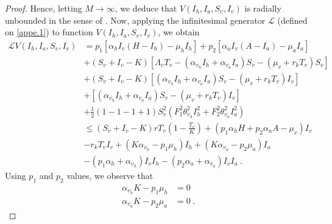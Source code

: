 \begin{proof}
	Hence, letting $M \to \infty$, we deduce that
	$
		V(I_{h},I_{a},S_{v},I_{v})
	$
	is radially unbounded in the sense of .
	Now, applying the infinitesimal generator $\mathcal{L}$ (defined on 
	\ref{appe.1}) to function $V(I_{h},I_{a},S_{v},I_{v})$, we obtain
	\begin{align*}
		\mathcal{L}V(I_{h},I_{a},S_{v},I_{v}) 
			&= p_{1} 
			\left[ 
				\alpha_{h}I_{v}
					\left(
						H-I_{h}
					\right)
					-\mu_{h}I_{h} 
			\right] 
			+ p_{2} 
			\left[
				\alpha_{a}I_{v}
				\left(
					A-I_{a}
				\right)
				-\mu_{a}I_{a} 
			\right]\\
			&+ 
			\left(
				S_{v}+I_{v}-K 
			\right)
			\left[
				\Lambda_{v} T_{v}
				-
				\left(
					\alpha_{v_{h}}I_{h}
					+\alpha_{v_{a}}I_{a}
				\right)S_{v}
				-
				\left(
					\mu_{v} 
					+r_{k}T_{v}
				\right)S_{v}
			\right]
			\\
			&+
			\left(
				S_{v}
				+I_{v}-K
			\right)
			\left[
				\left(
					\alpha_{v_{h}}I_{h}
					+\alpha_{v_{a}}I_{a}
				\right)
				S_{v}
				-
				\left(
					\mu_{v}
					+r_{k}T_{v}
				\right)
				I_{v}
			\right]
			\\
			&+ 
			\left[
				\left(
					\alpha_{v_{h}}I_{h}
					+\alpha_{v_{a}} I_{a}
				\right)
				S_{v}
				-
				\left(
					\mu_{v}
					+r_{k} T_{v}
				\right)
				I_{v}
			\right]
			\\
			&+
			\frac{1}{2}
			\left(
				1-1-1+1
			\right)
			S_{v}^{2}
			\left(
				F_{1}^{2}\theta_{v_{h}}^{2}I_{h}^{2}
				+F_{2}^{2}\theta_{v_{a}}^{2}I_{a}^{2}
			\right)
			\\
			&\leq
			\left(
				S_{v} + I_{v}-K
			\right) rT_{v}
			\left(
				1 - \frac{T_{v}}{K}
			\right)
			+
			\left(
				p_{1} \alpha_{h}H
				+ p_{2} \alpha_{a}A
				- \mu_{v}
			\right) I_{v}
			\\
			&-
			r_{k} T_{v }I_{v}
			+
			\left(
				K\alpha_{v_{h}}
				- p_{1}\mu_{h}
			\right)I_{h}
			+
			\left(
				K \alpha_{v_{a}}
				- p_{2} \mu_{a}
			\right)I_{a}
			\\ %
			&-
			\left(
				p_{1} \alpha_{h}
				+ \alpha_{v_{h}}
			\right)
			I_{v} I_{h}
			-
			\left(
				p_{2} \alpha_{a}
				+ \alpha_{v_{a}}
			\right)
			I_{v} I_{a} ~.
	\end{align*}
	Using $p_{1}$ and $p_{2}$ values, we observe that
	\begin{align*}
		\alpha_{v_{h}}K - p_{1}\mu_{h} &= 0\\
		\alpha_{v_{a}}K - p_{2}\mu_{a} &= 0 ~.
	\end{align*}

\end{proof}
